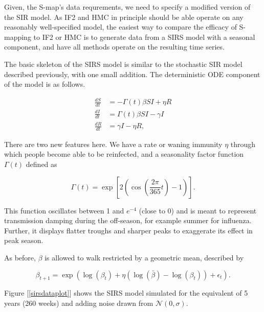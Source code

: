 	Given, the S-map's data requrements, we need to specify a modified version of the SIR model. As IF2 and HMC in principle should be able operate on any reasonably well-specified model, the easiest way to compare the efficacy of S-mapping to IF2 or HMC is to generate data from a SIRS model with a seasonal component, and have all methods operate on the resulting time series.

	The basic skeleton of the SIRS model is similar to the stochastic SIR model described previously, with one small addition. The deterministic ODE component of the model is as follows.

	\begin{equation}
		\begin{aligned}
			\frac{dS}{dt} & = - \Gamma(t) \beta S I + \eta R \\
			\frac{dI}{dt} & = \Gamma(t) \beta S I - \gamma I \\
			\frac{dR}{dt} & = \gamma I - \eta R,
		\end{aligned}
	\end{equation}

	There are two new features here. We have a rate or waning immunity $\eta$ through which people become able to be reinfected, and a seasonality factor function $\Gamma (t)$ defined as

	\begin{equation}
		\Gamma(t) = \exp \left[ 2 \left( \cos \left(  \frac{2 \pi}{365} t \right) - 1 \right) \right].
	\end{equation}

	This function oscillates between 1 and $e^{-4}$ (close to 0) and is meant to represent transmission damping during the off-season, for example summer for influenza. Further, it displays flatter troughs and sharper peaks to exaggerate its effect in peak season.

	As before, $\beta$ is allowed to walk restricted by a geometric mean, described by

	\begin{equation}
		\beta_{t+1} = \exp \left( \log(\beta_{t}) + \eta (\log(\bar{\beta}) - \log(\beta_{t})) + \epsilon_{t} \right).
	\end{equation}

	Figure [\ref{sirsdataplot}] shows the SIRS model simulated for the equivalent of 5 years (260 weeks) and adding noise drawn from $\mathcal{N}(0,\sigma)$.

